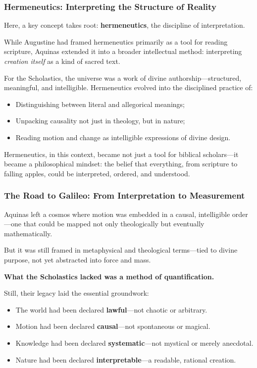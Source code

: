 \subsubsection*{Hermeneutics: Interpreting the Structure of Reality}

Here, a key concept takes root: \textbf{hermeneutics}, the discipline of interpretation.

While Augustine had framed hermeneutics primarily as a tool for reading scripture, Aquinas extended it into a broader intellectual method: interpreting \textit{creation itself} as a kind of sacred text.

For the Scholastics, the universe was a work of divine authorship—structured, meaningful, and intelligible. Hermeneutics evolved into the disciplined practice of:

\begin{itemize}
    \item Distinguishing between literal and allegorical meanings;
    \item Unpacking causality not just in theology, but in nature;
    \item Reading motion and change as intelligible expressions of divine design.
\end{itemize}

Hermeneutics, in this context, became not just a tool for biblical scholars—it became a philosophical mindset: the belief that everything, from scripture to falling apples, could be interpreted, ordered, and understood.

\subsubsection{The Road to Galileo: From Interpretation to Measurement}

Aquinas left a cosmos where motion was embedded in a causal, intelligible order—one that could be mapped not only theologically but eventually mathematically.  

But it was still framed in metaphysical and theological terms—tied to divine purpose, not yet abstracted into force and mass.

\textbf{What the Scholastics lacked was a method of quantification.}

Still, their legacy laid the essential groundwork:

\begin{itemize}
    \item The world had been declared \textbf{lawful}—not chaotic or arbitrary.
    \item Motion had been declared \textbf{causal}—not spontaneous or magical.
    \item Knowledge had been declared \textbf{systematic}—not mystical or merely anecdotal.
    \item Nature had been declared \textbf{interpretable}—a readable, rational creation.
\end{itemize}

